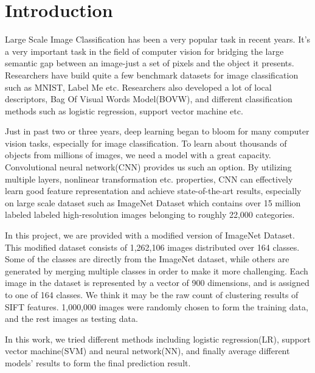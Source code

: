 \section{Introduction}
Large Scale Image Classification has been a very popular task in recent years.  It's a very important task in the field of computer vision for bridging the large semantic gap between an image-just a set of pixels  and  the object it presents. Researchers have build quite a few benchmark datasets for image classification such as MNIST, Label Me etc. Researchers also developed a lot of local descriptors, Bag Of Visual Words Model(BOVW), and different classification methods such as logistic regression, support vector machine etc. 

Just in past two or three years, deep learning began to bloom for many computer vision tasks, especially for image classification. To learn about thousands of objects from millions of images, we need a model with a great capacity. Convolutional neural network(CNN) provides us such an option. By utilizing multiple layers, nonlinear transformation etc. properties, CNN can effectively learn good feature representation and achieve state-of-the-art results, especially on large scale dataset such as ImageNet Dataset which contains over 15 million labeled labeled high-resolution images belonging to roughly 22,000 categories.  

In this project, we are provided with a modified version of ImageNet Dataset. This modified dataset consists of 1,262,106 images distributed over 164 classes. Some of the classes are directly from the ImageNet dataset, while others are generated by merging multiple classes in order to make it more challenging. Each image in the dataset is represented by a vector of 900 dimensions, and is assigned to one of 164 classes. We think it may be the raw count of  clustering results of SIFT features.  1,000,000 images were randomly chosen to form the training data, and the rest images as testing data. 

In this work, we tried different methods including logistic regression(LR), support vector machine(SVM) and neural network(NN), and finally average different models' results to form the final prediction result. 